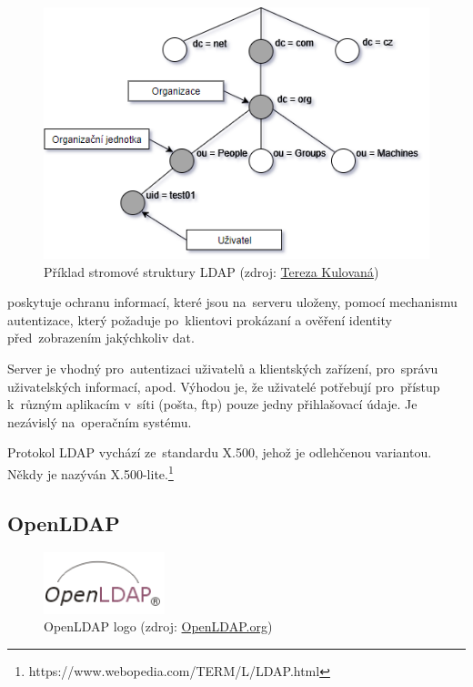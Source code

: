 \begin{figure}[H] \centering
      \includegraphics[width=380pt]{./pictures/ldap_dit.png}
      \caption[Příklad stromové struktury LDAP]{Příklad stromové struktury LDAP (zdroj:
	  \href{}{Tereza Kulovaná})}
      \label{fig:ldap-dit}
\end{figure}

 poskytuje ochranu informací, které jsou na~serveru uloženy,
pomocí mecha\-nismu autentizace, který požaduje po~klientovi prokázaní a
ověření identity před~zobrazením jakýchkoliv dat.

Server  je vhodný pro~autentizaci uživatelů a klientských
zařízení, pro~sprá\-vu uživatelských informací, apod. Výhodou je, že
uživatelé potřebují pro~přístup k~různým aplikacím v~síti (pošta, ftp)
pouze jedny přihlašovací údaje. Je nezávislý na~operačním systému.

Protokol LDAP vychází ze~standardu X.500, jehož je odlehčenou
variantou. Někdy je nazýván
X.500-lite.\footnote{https://www.webopedia.com/TERM/L/LDAP.html}

\newpage
\subsection{OpenLDAP}
\label{openldap}

\begin{figure}[H] \centering
      \includegraphics[width=100pt]{./pictures/LDAPlogo.png}
      \caption[OpenLDAP logo]{OpenLDAP logo (zdroj:
	  \href{http://www.openldap.org/images/headers/LDAPlogo.gif}{OpenLDAP.org})}
      \label{fig:ldap}
\end{figure}

